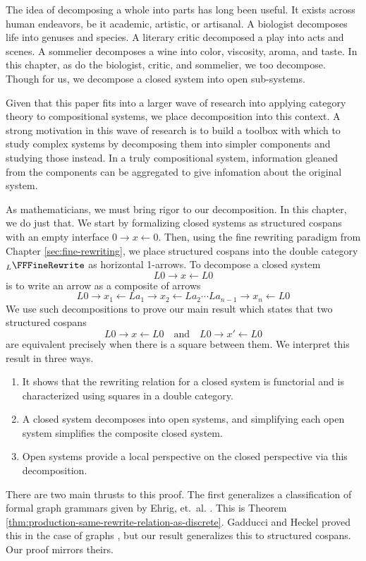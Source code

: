 \documentclass{amsart}
\begin{document}
The idea of decomposing a whole into parts has long been
useful. It exists across human endeavors, be it
academic, artistic, or artisanal. A biologist decomposes
life into genuses and species. A literary critic
decomposed a play into acts and scenes. A sommelier
decomposes a wine into color, viscosity, aroma, and
taste. In this chapter, as do the biologist, critic, and
sommelier, we too decompose. Though for us, we decompose a
closed system into open sub-systems.

Given that this paper fits into a larger wave of research
into applying category theory to compositional systems, we
place decomposition into this context.  A strong
motivation in this wave of research is to build a toolbox
with which to study complex systems by decomposing them into
simpler components and studying those instead. In a truly
compositional system, information gleaned from the
components can be aggregated to give infomation about the
original system.

As mathematicians, we must bring rigor to our
decomposition. In this chapter, we do just that. We start
by formalizing closed systems as structured cospans with an
empty interface $ 0 \to x \gets 0 $. Then,
using the fine rewriting paradigm from Chapter
\ref{sec:fine-rewriting}, we place structured cospans into
the double category $ _L \FFFineRewrite $ as horizontal
1-arrows.  To decompose a closed system $$L0 \to x \gets
L0$$ is to write an arrow as a composite of arrows
\[
  L0 \to x_1 \gets La_1 \to x_2 \gets La_2
  \dotsm La_{n-1} \to x_n \gets L0
\]
We use such decompositions to prove our main result which states that two structured cospans
\[
  L0 \to x \gets L0
  \quad \text{and} \quad
  L0 \to x' \gets L0
\]
are equivalent precisely when there is a square between
them.  We interpret this result in three ways.

\begin{enumerate}
\item It shows that the rewriting relation for a closed system
  is functorial and is characterized using squares in a double
  category.
\item A closed system decomposes into open systems, and
  simplifying each open system simplifies the composite
  closed system.  
\item Open systems provide a local perspective on the closed
  perspective via this decomposition.
\end{enumerate}

There are two main thrusts to this proof.  The first
generalizes a classification of formal graph grammars given
by Ehrig, et.~al. \cite{Ehrig_GraphGram}. This is
Theorem \ref{thm:production-same-rewrite-relation-as-discrete}.
Gadducci and Heckel proved this in the case of graphs
\cite{Gadd_IndGraphTrans}, but our result generalizes
this to structured cospans. Our proof mirrors theirs.
\end{document}
